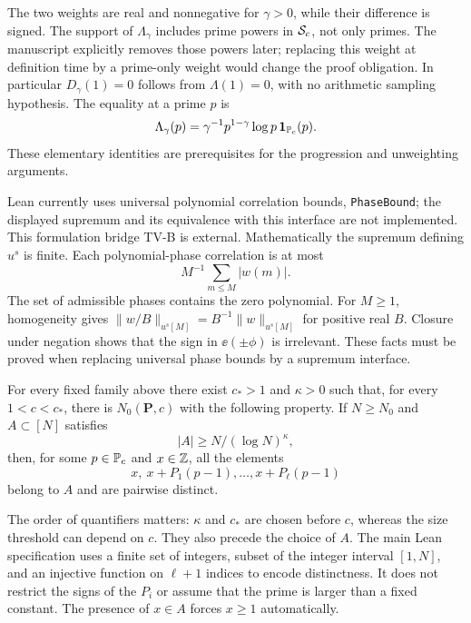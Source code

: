 The two weights are real and nonnegative for $\gamma>0$, while their difference is signed. The support of $\Lambda_\gamma$ includes prime powers in $\mathcal S_c$, not only primes. The manuscript explicitly removes those powers later; replacing this weight at definition time by a prime-only weight would change the proof obligation. In particular $D_\gamma(1)=0$ follows from $\Lambda(1)=0$, with no arithmetic sampling hypothesis. The equality at a prime $p$ is
\[
 \Lambda_\gamma(p)=\gamma^{-1}p^{1-\gamma}\log p\,\mathbf 1_{\mathbb P_c}(p).
\]
These elementary identities are prerequisites for the progression and unweighting arguments.

Lean currently uses universal polynomial correlation bounds, \texttt{PhaseBound}; the displayed supremum and its equivalence with this interface are not implemented. This formulation bridge TV-B is external. Mathematically the supremum defining $u^s$ is finite. Each polynomial-phase correlation is at most
\[M^{-1}\sum_{m\leq M}|w(m)|.\] The set of admissible phases contains the zero polynomial. For $M\geq1$, homogeneity gives $\|w/B\|_{u^s[M]}=B^{-1}\|w\|_{u^s[M]}$ for positive real $B$. Closure under negation shows that the sign in $\ee(\pm\phi)$ is irrelevant. These facts must be proved when replacing universal phase bounds by a supremum interface.
\fi

\begin{theorem}\label{t:szemeredi}
\leanok
For every fixed family above there exist $c_*>1$ and $\kappa>0$ such that, for every $1<c<c_*$, there is $N_0(\mathbf P,c)$ with the following property. If $N\geq N_0$ and $A\subset[N]$ satisfies
\[
 |A|\geq N/(\log N)^\kappa,
\]
then, for some $p\in\mathbb P_c$ and $x\in\mathbb Z$, all the elements
\[
 x,\ x+P_1(p-1),\ldots,x+P_\ell(p-1)
\]
belong to $A$ and are pairwise distinct.
\end{theorem}
\ifDetailed
The order of quantifiers matters: $\kappa$ and $c_*$ are chosen before $c$, whereas the size threshold can depend on $c$. They also precede the choice of $A$. The main Lean specification uses a finite set of integers, subset of the integer interval $[1,N]$, and an injective function on $\ell+1$ indices to encode distinctness. It does not restrict the signs of the $P_i$ or assume that the prime is larger than a fixed constant. The presence of $x\in A$ forces $x\geq1$ automatically.

